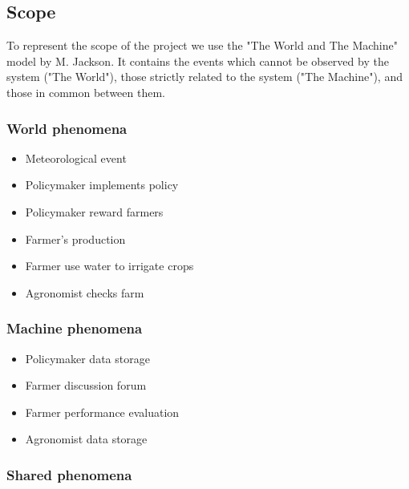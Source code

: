 \subsection{Scope}
To represent the scope of the project we use the "The World and The Machine" model by M. Jackson. 
It contains the events which cannot be observed by the system ("The World"), 
those strictly related to the system ("The Machine"), and those in common between them. 

\subsubsection{World phenomena}
\begin{itemize}
    \item Meteorological event
    \item Policymaker implements policy
    \item Policymaker reward farmers
    \item Farmer's production
    \item Farmer use water to irrigate crops
    \item Agronomist checks farm
\end{itemize}

\subsubsection{Machine phenomena}
\begin{itemize}
    \item Policymaker data storage
    \item Farmer discussion forum
    \item Farmer performance evaluation
    \item Agronomist data storage
\end{itemize}

\subsubsection{Shared phenomena}
